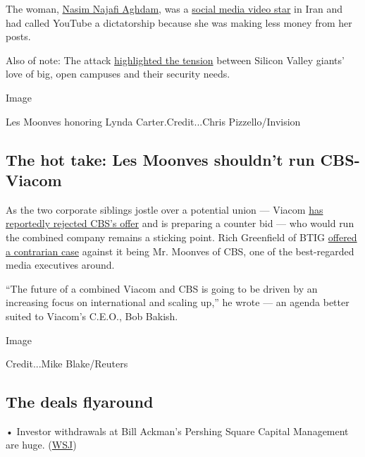 The woman,
\href{https://www.nytimes3xbfgragh.onion/2018/04/04/us/youtube-shooting-nasim-najafi-aghdam.html}{Nasim
Najafi Aghdam}, was a
\href{https://www.nytimes3xbfgragh.onion/video/world/middleeast/100000005833316/youtube-shooter-was-popular-and-ridiculed-in-iran.html}{social
media video star} in Iran and had called YouTube a dictatorship because
she was making less money from her posts.

Also of note: The attack
\href{https://www.wsj.com/articles/youtube-shooting-raises-questions-about-silicon-valleys-open-campus-push-1522879455}{highlighted
the tension} between Silicon Valley giants' love of big, open campuses
and their security needs.

Image

Les Moonves honoring Lynda Carter.Credit...Chris Pizzello/Invision

\hypertarget{the-hot-take-les-moonves-shouldnt-run-cbs-viacom}{%
\subsection{The hot take: Les Moonves shouldn't run
CBS-Viacom}\label{the-hot-take-les-moonves-shouldnt-run-cbs-viacom}}

As the two corporate siblings jostle over a potential union --- Viacom
\href{http://www.latimes.com/business/hollywood/la-fi-ct-viacom-cbs-merger-20180404-story.html?dlbk}{has
reportedly rejected CBS's offer} and is preparing a counter bid --- who
would run the combined company remains a sticking point. Rich Greenfield
of BTIG
\href{https://www.btigresearch.com/wp-login.php?redirect_to=\%2F2018\%2F04\%2F04\%2Fviacom-and-cbs-merger-must-avoid-management-chaos\%2F\%3Fdlbk}{offered
a contrarian case} against it being Mr. Moonves of CBS, one of the
best-regarded media executives around.

``The future of a combined Viacom and CBS is going to be driven by an
increasing focus on international and scaling up,'' he wrote --- an
agenda better suited to Viacom's C.E.O., Bob Bakish.

Image

Credit...Mike Blake/Reuters

\hypertarget{the-deals-flyaround}{%
\subsection{The deals flyaround}\label{the-deals-flyaround}}

• Investor withdrawals at Bill Ackman's Pershing Square Capital
Management are huge.
(\href{https://www.wsj.com/articles/pershing-square-faces-wave-of-investor-redemptions-1522920601?dlbk}{WSJ})

